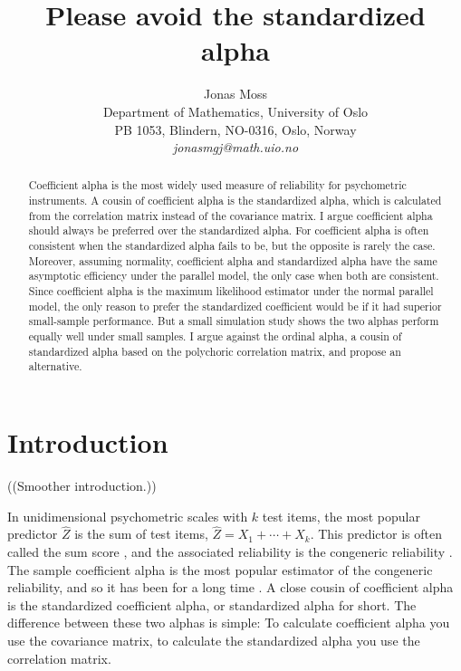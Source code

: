 \documentclass[twoside]{article}
\title{Please avoid the standardized alpha}
\author{
  Jonas Moss \orcid{0000-0002-6876-6964} \\
  Department of Mathematics, University of Oslo\\
  PB 1053, Blindern, NO-0316, Oslo, Norway \\
  \it{jonasmgj@math.uio.no}
}
\begin{document}
\maketitle

\begin{abstract}
Coefficient alpha is the most widely used measure of reliability for psychometric instruments. A cousin of coefficient alpha is the standardized alpha, which is calculated from the correlation matrix instead of the covariance matrix. I argue coefficient alpha should always be preferred over the standardized alpha. For coefficient alpha is often consistent when the standardized alpha fails to be, but the opposite is rarely the case. Moreover, assuming normality, coefficient alpha and standardized alpha have the same asymptotic efficiency under the parallel model, the only case when both are consistent. Since coefficient alpha is the maximum likelihood estimator under the normal parallel model, the only reason to prefer the standardized coefficient would be if it had superior small-sample performance. But a small simulation study shows the two alphas perform equally well under small samples. I argue against the ordinal alpha, a cousin of standardized alpha based on the polychoric correlation matrix, and propose an alternative.
\end{abstract}


\section{Introduction}

((Smoother introduction.))

In unidimensional psychometric scales with $k$ test items, the most popular predictor $\hat{Z}$ is the sum of test items, $\hat{Z}=X_1 + \cdots + X_k$. This predictor is often called the sum score \citep{McNeish2019-ea}, and the associated reliability is the congeneric reliability \citep{Cho2016-bs}. The sample coefficient alpha is the most popular estimator of the congeneric reliability, and so it has been for a long time \citep{McNeish2018-vu}. A close cousin of coefficient alpha is the standardized coefficient alpha, or standardized alpha for short. The difference between these two alphas is simple: To calculate coefficient alpha you use the covariance matrix, to calculate the standardized alpha you use the correlation matrix.
\end{document}
